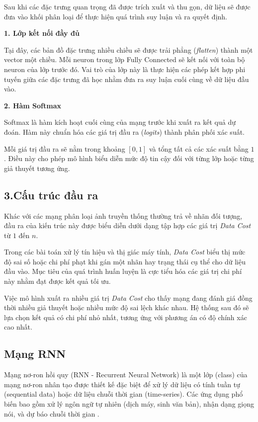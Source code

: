 Sau khi các đặc trưng quan trọng đã được trích xuất và thu gọn, dữ liệu sẽ được đưa vào khối phân loại để thực hiện quá trình suy luận và ra quyết định.

\textbf{1. Lớp kết nối đầy đủ}

Tại đây, các bản đồ đặc trưng nhiều chiều sẽ được trải phẳng (\textit{flatten}) thành một vector một chiều. Mỗi neuron trong lớp Fully Connected sẽ kết nối với toàn bộ neuron của lớp trước đó. Vai trò của lớp này là thực hiện các phép kết hợp phi tuyến giữa các đặc trưng đã học nhằm đưa ra suy luận cuối cùng về dữ liệu đầu vào.

\textbf{2. Hàm Softmax}

Softmax là hàm kích hoạt cuối cùng của mạng trước khi xuất ra kết quả dự đoán. Hàm này chuẩn hóa các giá trị đầu ra (\textit{logits}) thành phân phối xác suất.

Mỗi giá trị đầu ra sẽ nằm trong khoảng $[0,1]$ và tổng tất cả các xác suất bằng $1$. Điều này cho phép mô hình biểu diễn mức độ tin cậy đối với từng lớp hoặc từng giả thuyết tương ứng.

\subsection*{3.Cấu trúc đầu ra}

Khác với các mạng phân loại ảnh truyền thống thường trả về nhãn đối tượng, đầu ra của kiến trúc này được biểu diễn dưới dạng tập hợp các giá trị \textit{Data Cost} từ $1$ đến $n$.

Trong các bài toán xử lý tín hiệu và thị giác máy tính, \textit{Data Cost} biểu thị mức độ sai số hoặc chi phí phạt khi gán một nhãn hay trạng thái cụ thể cho dữ liệu đầu vào. Mục tiêu của quá trình huấn luyện là cực tiểu hóa các giá trị chi phí này nhằm đạt được kết quả tối ưu.

Việc mô hình xuất ra nhiều giá trị \textit{Data Cost} cho thấy mạng đang đánh giá đồng thời nhiều giả thuyết hoặc nhiều mức độ sai lệch khác nhau. Hệ thống sau đó sẽ lựa chọn kết quả có chi phí nhỏ nhất, tương ứng với phương án có độ chính xác cao nhất.

\subsection{Mạng RNN}

Mạng nơ-ron hồi quy (RNN - Recurrent Neural Network) là một lớp (class) của mạng nơ-ron nhân tạo được thiết kế đặc biệt để xử lý dữ liệu có tính tuần tự (sequential data) hoặc dữ liệu chuỗi thời gian (time-series). Các ứng dụng phổ biến bao gồm xử lý ngôn ngữ tự nhiên (dịch máy, sinh văn bản), nhận dạng giọng nói, và dự báo chuỗi thời gian \cite{Reference5}.


